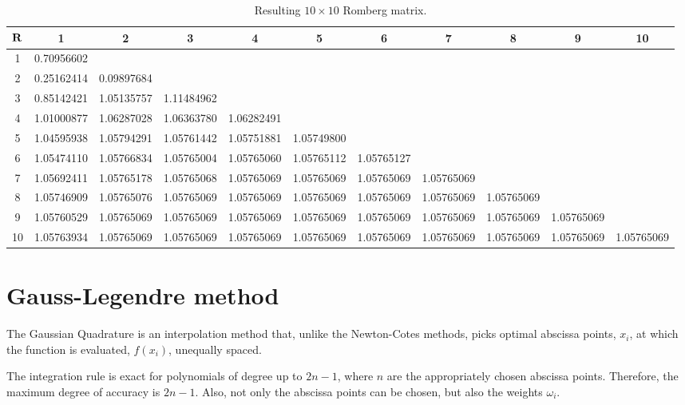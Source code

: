 \begin{table}[tb!]
    \caption{Resulting $10 \times 10$ Romberg matrix.}
    \label{tab:results-romberg}
    \centering
    { \tiny
        \begin{tabular}{@{}c | c c c c c c c c c c@{}}
            \toprule
            $\boldsymbol{\mathrm{R}} $& 1 & 2 & 3 & 4 & 5 & 6 & 7 & 8 & 9 & 10 \\
            \midrule

            1  & 0.70956602 & & & & & & & & & \\
            2  & 0.25162414 & 0.09897684 & & & & & & & & \\
            3  & 0.85142421 & 1.05135757 & 1.11484962 & & & & & & & \\
            4  & 1.01000877 & 1.06287028 & 1.06363780 & 1.06282491 & & & & & & \\
            5  & 1.04595938 & 1.05794291 & 1.05761442 & 1.05751881 & 1.05749800 & & & & & \\
            6  & 1.05474110 & 1.05766834 & 1.05765004 & 1.05765060 & 1.05765112 & 1.05765127 & & & & \\
            7  & 1.05692411 & 1.05765178 & 1.05765068 & 1.05765069 & 1.05765069 & 1.05765069 & 1.05765069 & & & \\
            8  & 1.05746909 & 1.05765076 & 1.05765069 & 1.05765069 & 1.05765069 & 1.05765069 & 1.05765069 & 1.05765069 & & \\
            9  & 1.05760529 & 1.05765069 & 1.05765069 & 1.05765069 & 1.05765069 & 1.05765069 & 1.05765069 & 1.05765069 & 1.05765069 & \\
            10 & 1.05763934 & 1.05765069 & 1.05765069 & 1.05765069 & 1.05765069 & 1.05765069 & 1.05765069 & 1.05765069 & 1.05765069 & 1.05765069 \\

            \bottomrule
        \end{tabular}
    }
\end{table}

\section{Gauss-Legendre method}
The Gaussian Quadrature is an interpolation method that, unlike the Newton-Cotes
methods, picks optimal abscissa points, $x_i$, at which the function is evaluated,
$f\left( x_i \right)$, unequally spaced.

The integration rule is exact for polynomials of degree up to $2n - 1$, where $n$ 
are the appropriately chosen abscissa points.
Therefore, the maximum degree of accuracy is $2n - 1$.
Also, not only the abscissa points can be chosen, but also the weights $\omega_i$.

